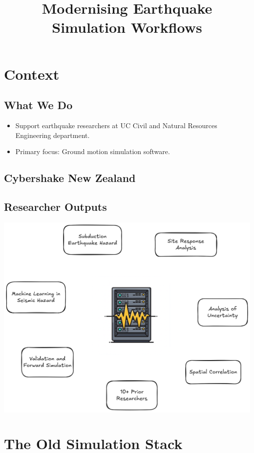 \documentclass[11pt]{article}
\date{}
\title{Modernising Earthquake Simulation Workflows}
\begin{document}
\maketitle
\section*{Context}
\label{sec:orga56ed24}

\subsection*{What We Do}
\label{sec:orgc4636dc}
\begin{itemize}
\item Support earthquake researchers at UC Civil and Natural Resources Engineering department.
\item Primary focus: Ground motion simulation software.
\end{itemize}
\subsection*{Cybershake New Zealand}
\label{sec:org06d9fab}
\subsection*{Researcher Outputs}
\label{sec:orgb654618}
\begin{center}
\includegraphics[width=.9\linewidth]{researcher.png}
\end{center}
\section*{The Old Simulation Stack}
\label{sec:orgf323305}
\end{document}
